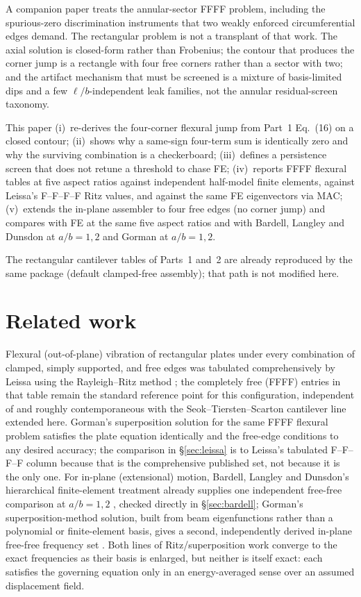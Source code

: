 \documentclass[11pt]{article}
\begin{document}
A companion paper \cite{mccune2026annular} treats the annular-sector FFFF
problem, including the spurious-zero discrimination instruments that two
weakly enforced circumferential edges demand. The rectangular problem is
not a transplant of that work. The axial solution is closed-form rather
than Frobenius; the contour that produces the corner jump is a rectangle
with four free corners rather than a sector with two; and the artifact
mechanism that must be screened is a mixture of basis-limited dips and a
few $\ell/b$-independent leak families, not the annular residual-screen
taxonomy.

This paper (i)~re-derives the four-corner flexural jump from Part~1
Eq.~(16) on a closed contour; (ii)~shows why a same-sign four-term sum is
identically zero and why the surviving combination is a checkerboard;
(iii)~defines a persistence screen that does not retune a threshold to
chase FE; (iv)~reports FFFF flexural tables at five aspect ratios against
independent half-model finite elements, against Leissa's F--F--F--F Ritz
values, and against the same FE eigenvectors via MAC; (v)~extends the
in-plane assembler to four free edges (no corner jump) and compares with
FE at the same five aspect ratios and with Bardell, Langley and Dunsdon
\cite{bardell1996} at $a/b=1,2$ and Gorman \cite{gorman2004} at
$a/b=1,2$.

The rectangular cantilever tables of Parts~1 and~2 are already reproduced
by the same package (default clamped-free assembly); that path is not
modified here.

\section{Related work}\label{sec:related}
Flexural (out-of-plane) vibration of rectangular plates under every
combination of clamped, simply supported, and free edges was tabulated
comprehensively by Leissa using the Rayleigh--Ritz method
\cite{leissa1973}; the completely free (FFFF) entries in that table
remain the standard reference point for this configuration, independent
of and roughly contemporaneous with the Seok--Tiersten--Scarton
cantilever line \cite{seok3,seok4} extended here. Gorman's superposition
solution for the same FFFF flexural problem \cite{gorman1978} satisfies
the plate equation identically and the free-edge conditions to any
desired accuracy; the comparison in \S\ref{sec:leissa} is to Leissa's
tabulated F--F--F--F column because that is the comprehensive published
set, not because it is the only one. For in-plane
(extensional) motion, Bardell, Langley and Dunsdon's hierarchical
finite-element treatment already supplies one independent free-free
comparison at $a/b=1,2$ \cite{bardell1996}, checked directly in
\S\ref{sec:bardell}; Gorman's superposition-method solution, built from
beam eigenfunctions rather than a polynomial or finite-element basis,
gives a second, independently derived in-plane free-free frequency set
\cite{gorman2004}. Both lines of Ritz/superposition work converge to the
exact frequencies as their basis is enlarged, but neither is itself
exact: each satisfies the governing equation only in an energy-averaged
sense over an assumed displacement field.
\end{document}
